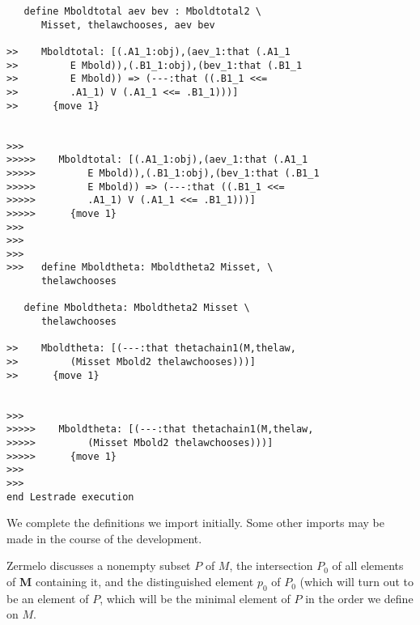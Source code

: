 \documentclass[12pt]{article}
\begin{document}
\begin{verbatim}
   define Mboldtotal aev bev : Mboldtotal2 \
      Misset, thelawchooses, aev bev

>>    Mboldtotal: [(.A1_1:obj),(aev_1:that (.A1_1
>>         E Mbold)),(.B1_1:obj),(bev_1:that (.B1_1
>>         E Mbold)) => (---:that ((.B1_1 <<=
>>         .A1_1) V (.A1_1 <<= .B1_1)))]
>>      {move 1}


>>>
>>>>>    Mboldtotal: [(.A1_1:obj),(aev_1:that (.A1_1
>>>>>         E Mbold)),(.B1_1:obj),(bev_1:that (.B1_1
>>>>>         E Mbold)) => (---:that ((.B1_1 <<=
>>>>>         .A1_1) V (.A1_1 <<= .B1_1)))]
>>>>>      {move 1}
>>>
>>>
>>>
>>>   define Mboldtheta: Mboldtheta2 Misset, \
      thelawchooses

   define Mboldtheta: Mboldtheta2 Misset \
      thelawchooses

>>    Mboldtheta: [(---:that thetachain1(M,thelaw,
>>         (Misset Mbold2 thelawchooses)))]
>>      {move 1}


>>>
>>>>>    Mboldtheta: [(---:that thetachain1(M,thelaw,
>>>>>         (Misset Mbold2 thelawchooses)))]
>>>>>      {move 1}
>>>
>>>
end Lestrade execution
\end{verbatim}

We complete the definitions we import initially.  Some other imports may be made in the course of the development.

Zermelo discusses a nonempty subset $P$ of $M$, the intersection $P_0$ of all elements of {\bf M} containing it, and the distinguished element $p_0$ of $P_0$ (which will turn out to be an element of $P$, which will be the minimal element of $P$ in the order we define on $M$.
\end{document}
